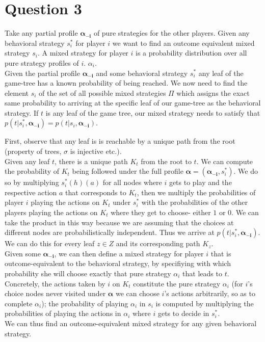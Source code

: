 \documentclass[10pt,a4paper]{article}
\begin{document}
\section*{Question 3}
Take any partial profile $\bm{\alpha_{-i}}$ of pure strategies for the other players. Given any behavioral strategy $s_i^*$ for player $i$ we want to find an outcome equivalent mixed strategy $s_i$. A mixed strategy for player $i$ is a probability distribution over all pure strategy profiles of $i$. $\alpha_i$.\\
Given the partial profile $\bm{\alpha_{-i}}$ and some behavioral strategy $s_i^*$ any leaf of the game-tree has a known probability of being reached. We now need to find the element $s_i$ of the set of all possible mixed strategies $\Pi$ which assigns the exact same probability to arriving at the specific leaf of our game-tree as the behavioral strategy. If $t$ is any leaf of the game tree, our mixed strategy needs to satisfy that $p(t|s_i^*,\bm{\alpha_{-i}}) = p(t|s_i,\bm{\alpha_{-i}})$.

\noindent First, observe that any leaf is is reachable by a unique path from the root (property of trees, $\sigma$ is injective etc.).\\
Given any leaf $t$, there is a unique path $K_t$ from the root to $t$. We can compute the probability of $K_t$ being followed under the full profile $\bm{\alpha}=(\bm{\alpha_{-i}},s_i^*)$. We do so by multiplying $s_i^*(h)(a)$ for all nodes where $i$ gets to play and the respective action $a$ that corresponds to $K_t$, then we multiply the probabilities of player $i$ playing the actions on $K_t$ under $s_i^*$ with the probabilities  of the other players playing the actions on $K_t$ where they get to choose- either $1$ or $0$. We can take the product in this way because we are assuming that the choices at different nodes are probabilistically independent. Thus we arrive at $p(t|s_i^*,\bm{\alpha_{-i}})$. We can do this for every leaf $z\in Z$ and its corresponding path $K_z$. \\
Given some $\bm{\alpha_{-i}}$, we can then define a mixed strategy for player $i$ that is outcome-equivalent to the behavioral strategy, by specifiying with which probability she will choose exactly that pure strategy $\alpha_i$ that leads to $t$. Concretely, the actions taken by $i$ on $K_t$ constitute the pure strategy $\alpha_i$ (for $i$'s choice nodes never visited under $\bm{\alpha}$ we can choose $i$'s actions arbitrarily, so as to complete $\alpha_i$); the probability of playing $\alpha_i$ in $s_i$ is computed by multiplying the probabilities of playing the actions in $\alpha_i$ where $i$ gets to decide in $s_i^*$.\\
We can thus find an outcome-equivalent mixed strategy for any given behavioral strategy.
\end{document}
